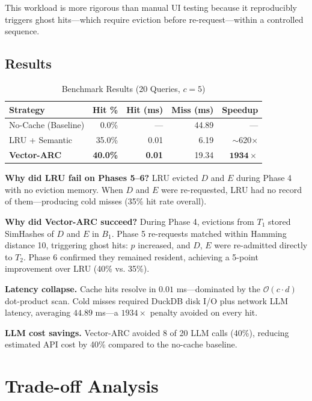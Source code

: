 \documentclass[conference,10pt]{IEEEtran}
\begin{document}
This workload is more rigorous than manual UI testing because it reproducibly triggers ghost hits—which require eviction before re-request—within a controlled sequence.

\subsection{Results}

\begin{table}[htbp]
\centering
\caption{Benchmark Results (20 Queries, $c=5$)}
\label{tab:results}
\begin{tabular}{@{}lrrrr@{}}
\toprule
\textbf{Strategy} & \textbf{Hit \%} & \textbf{Hit (ms)} & \textbf{Miss (ms)} & \textbf{Speedup} \\ \midrule
No-Cache (Baseline) & 0.0\%  & —    & 44.89 & — \\
LRU + Semantic      & 35.0\% & 0.01 & 6.19  & $\sim$620$\times$ \\
\textbf{Vector-ARC} & \textbf{40.0\%} & \textbf{0.01} & 19.34 & $\mathbf{1934\times}$ \\ \bottomrule
\end{tabular}
\end{table}

\textbf{Why did LRU fail on Phases 5–6?} LRU evicted $D$ and $E$ during Phase 4 with no eviction memory. When $D$ and $E$ were re-requested, LRU had no record of them—producing cold misses (35\% hit rate overall).

\textbf{Why did Vector-ARC succeed?} During Phase 4, evictions from $T_1$ stored SimHashes of $D$ and $E$ in $B_1$. Phase 5 re-requests matched within Hamming distance 10, triggering ghost hits: $p$ increased, and $D$, $E$ were re-admitted directly to $T_2$. Phase 6 confirmed they remained resident, achieving a 5-point improvement over LRU (40\% vs. 35\%).

\textbf{Latency collapse.} Cache hits resolve in $0.01$ ms—dominated by the $\mathcal{O}(c\cdot d)$ dot-product scan. Cold misses required DuckDB disk I/O plus network LLM latency, averaging $44.89$ ms—a $1934\times$ penalty avoided on every hit.

\textbf{LLM cost savings.} Vector-ARC avoided 8 of 20 LLM calls (40\%), reducing estimated API cost by 40\% compared to the no-cache baseline.

\section{Trade-off Analysis}
\end{document}
